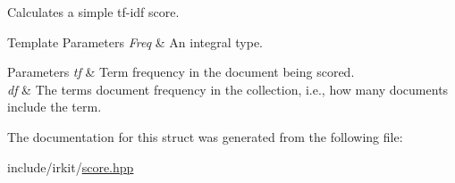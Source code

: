 Calculates a simple tf-\/idf score. 


\begin{DoxyTemplParams}{Template Parameters}
{\em Freq} & An integral type. \\
\hline
\end{DoxyTemplParams}

\begin{DoxyParams}{Parameters}
{\em tf} & Term frequency in the document being scored. \\
\hline
{\em df} & The term\textquotesingle{}s document frequency in the collection, i.\+e., how many documents include the term. \\
\hline
\end{DoxyParams}


The documentation for this struct was generated from the following file\+:\begin{DoxyCompactItemize}
\item 
include/irkit/\hyperlink{score_8hpp}{score.\+hpp}\end{DoxyCompactItemize}
